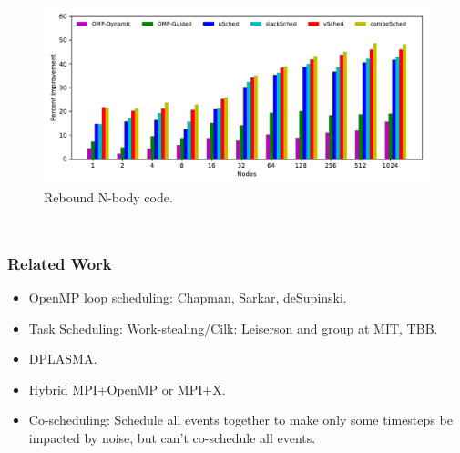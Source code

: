 \begin{frame}[label=perfComp]
\begin{columns}
\begin{figure}[ht]
\begin{center} 
\includegraphics[scale=0.18]{./plots/app-scaling-strat-nbody-fastNUMA2}\\
\vspace*{-0.16in}
{\tiny Rebound N-body code.}
\end{center}
\end{figure} 
\end{columns} 
\end{frame}

\begin{frame}[label=relatedWork]
\frametitle{Related Work}
\begin{itemize}
\small \item \small OpenMP loop scheduling: Chapman, Sarkar, deSupinski.
\item \small Task Scheduling:  Work-stealing/Cilk: Leiserson and group at MIT, TBB. 
\item \small DPLASMA. 
\item \small Hybrid MPI+OpenMP or MPI+X. 
\item \small Co-scheduling: Schedule all events together to make only some timesteps be impacted by noise, but can't co-schedule all events.
\end{itemize}
\end{frame}  

